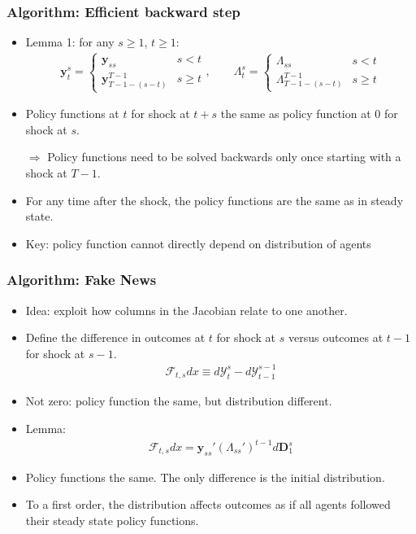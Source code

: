 \documentclass[english,xcolor=svgnames]{beamer}
\begin{document}
\begin{frame}
    \frametitle{Algorithm: Efficient backward step}
    \begin{itemize}
    	\item Lemma 1: for any $s\ge 1$, $t\ge 1$:
    	\begin{align*}
    		\bm{y}_t^s = \begin{cases}
    			\bm{y}_{ss} & s<t \\
    			\bm{y}_{T-1-(s-t)}^{T-1} & s \ge t
    		\end{cases},\qquad  \Lambda_t^s = \begin{cases}
    			 \Lambda_{ss} & s<t \\
    			 \Lambda_{T-1-(s-t)}^{T-1} & s \ge t
    		\end{cases}
    	\end{align*}
    	\item Policy functions at $t$ for shock at $t+s$ the same as policy function at $0$ for shock at $s$. 
        \item[$\Rightarrow$] Policy functions need to be solved backwards only once starting with a shock at $T-1$.
%        
        \item For any time after the shock, the policy functions are the same as in steady state.
        \item Key: policy function cannot directly depend on distribution of agents
      \end{itemize}
\end{frame}

\begin{frame}
    \frametitle{Algorithm: Fake News}
    \begin{itemize}
    	\item Idea: exploit how columns in the Jacobian relate to one another.
        \item Define the difference in outcomes at $t$ for shock at $s$ versus outcomes at $t-1$ for shock at $s-1$.
        \begin{align*}
        	\mathcal{F}_{t,s}dx \equiv d\mathcal{Y}_{t}^{s} - d\mathcal{Y}_{t-1}^{s-1}
        \end{align*}
        \item Not zero: policy function the same, but distribution different.
        \item Lemma:
        \begin{align*}
        	\mathcal{F}_{t,s}dx = \bm{y}_{ss}' (\Lambda_{ss}')^{t-1}d\bm{D}_1^s
        \end{align*}
        \item Policy functions the same. The only difference is the initial distribution.
        \item To a first order, the distribution affects outcomes as if all agents followed their steady state policy functions.
	\end{itemize}
\end{frame}
\end{document}
